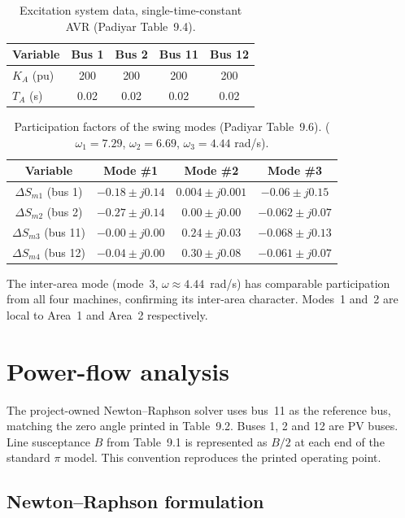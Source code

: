 \documentclass[12pt,a4paper]{article}
\begin{document}
\begin{table}[H]\centering
\caption{Excitation system data, single-time-constant AVR (Padiyar Table~9.4).}
\begin{tabular}{lcccc}\toprule
Variable & Bus 1 & Bus 2 & Bus 11 & Bus 12\\\midrule
$K_A$ (pu)  & 200  & 200  & 200  & 200\\
$T_A$ (s)   & 0.02 & 0.02 & 0.02 & 0.02\\\bottomrule
\end{tabular}\end{table}


\begin{table}[H]\centering\scriptsize
\caption{Participation factors of the swing modes (Padiyar Table~9.6).
($\omega_1=7.29$, $\omega_2=6.69$, $\omega_3=4.44$ rad/s).}
\begin{tabular}{cccc}\toprule
Variable & Mode \#1 & Mode \#2 & Mode \#3\\\midrule
$\Delta S_{m1}$ (bus 1)  & $-0.18 \pm j0.14$  & $0.004 \pm j0.001$ & $-0.06 \pm j0.15$\\
$\Delta S_{m2}$ (bus 2)  & $-0.27 \pm j0.14$  & $0.00 \pm j0.00$   & $-0.062 \pm j0.07$\\
$\Delta S_{m3}$ (bus 11) & $-0.00 \pm j0.00$  & $0.24 \pm j0.03$   & $-0.068 \pm j0.13$\\
$\Delta S_{m4}$ (bus 12) & $-0.04 \pm j0.00$  & $0.30 \pm j0.08$   & $-0.061 \pm j0.07$\\\bottomrule
\end{tabular}\end{table}

The inter-area mode (mode~3, $\omega\approx4.44$~rad/s) has comparable
participation from all four machines, confirming its inter-area character.
Modes~1 and~2 are local to Area~1 and Area~2 respectively.


\section{Power-flow analysis}

The project-owned Newton--Raphson solver uses bus~11 as the reference bus,
matching the zero angle printed in Table~9.2. Buses 1, 2 and 12 are PV buses.
Line susceptance $B$ from Table~9.1 is represented as $B/2$ at each end of the
standard $\pi$ model. This convention reproduces the printed operating point.

\subsection{Newton--Raphson formulation}
\end{document}
